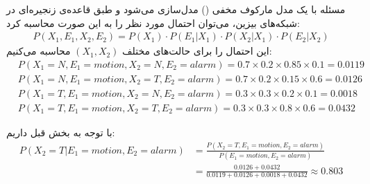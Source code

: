 \question{}

\begin{ابجد}
\item مسئله با یک مدل مارکوف مخفی () مدل‌سازی می‌شود و طبق قاعده‌ی زنجیره‌ای در شبکه‌های بیزین، می‌توان احتمال مورد نظر را به این صورت محاسبه کرد:
\begin{align*}
    P(X_1, E_1, X_2, E_2) = P(X_1) \cdot P(E_1 | X_1) \cdot P(X_2 | X_1) \cdot P(E_2 | X_2)
\end{align*}
این احتمال را برای حالت‌های مختلف $(X_1, X_2)$ محاسبه می‌کنیم:
\begin{align*}
     & P(X_1 = N, E_1 = motion, X_2 = N, E_2 = alarm) = 0.7 \times 0.2 \times 0.85 \times 0.1 = 0.0119 \\
     & P(X_1 = N, E_1 = motion, X_2 = T, E_2 = alarm) = 0.7 \times 0.2 \times 0.15 \times 0.6 = 0.0126 \\
     & P(X_1 = T, E_1 = motion, X_2 = N, E_2 = alarm) = 0.3 \times 0.3 \times 0.2 \times 0.1 = 0.0018  \\
     & P(X_1 = T, E_1 = motion, X_2 = T, E_2 = alarm) = 0.3 \times 0.3 \times 0.8 \times 0.6 = 0.0432
\end{align*}

\item با توجه به بخش قبل داریم:
\begin{align*}
    P(X_2 = T | E_1 = motion, E_2 = alarm) & = \frac{P(X_2 = T, E_1 = motion, E_2 = alarm)}{P(E_1 = motion, E_2 = alarm)} \\
                                           & = \frac{0.0126 + 0.0432}{0.0119 + 0.0126 + 0.0018 + 0.0432} \approx 0.803
\end{align*}

\end{ابجد}